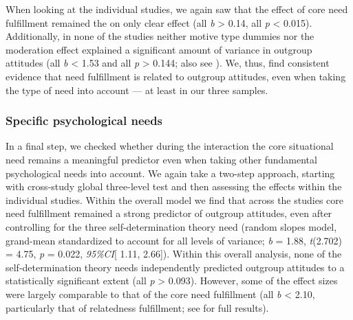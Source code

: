 When looking at the individual studies, we again saw that the effect of
core need fulfillment remained the on only clear effect (all
\textbar{}\textit{b}\textbar{} \textgreater{} 0.14, all \textit{p}
\textless{} 0.015). Additionally, in none of the studies neither motive
type dummies nor the moderation effect explained a significant amount of
variance in outgroup attitudes (all \textbar{}\textit{b}\textbar{}
\textless{} 1.53 and all \textit{p} \textgreater{} 0.144; also see
). We, thus, find consistent evidence that
need fulfillment is related to outgroup attitudes, even when taking the
type of need into account --- at least in our three samples.

\subsubsection{Specific psychological needs}

In a final step, we checked whether during the interaction the core
situational need remains a meaningful predictor even when taking other
fundamental psychological needs into account. We again take a two-step
approach, starting with cross-study global three-level test and then
assessing the effects within the individual studies. Within the overall
model we find that across the studies core need fulfillment remained a
strong predictor of outgroup attitudes, even after controlling for the
three self-determination theory need (random slopes model, grand-mean
standardized to account for all levels of variance; \textit{b} = 1.88,
\textit{t}(2.702) = 4.75, \textit{p} = 0.022, \textit{95\%CI}{[} 1.11,
2.66{]}). Within this overall analysis, none of the self-determination
theory needs independently predicted outgroup attitudes to a
statistically significant extent (all \textit{p} \textgreater{} 0.093).
However, some of the effect sizes were largely comparable to that of the
core need fulfillment (all \textbar{}\textit{b}\textbar{} \textless{}
2.10, particularly that of relatedness fulfillment; see
 for full results).

